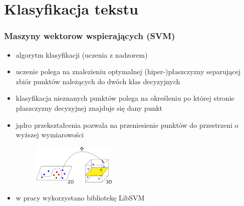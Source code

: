 \documentclass[11pt,t]{beamer}
\begin{document}
\section{Klasyfikacja tekstu}
\begin{frame}
\frametitle{Maszyny wektorow wspierających (SVM)}
\begin{itemize}
\item<1-> algorytm klasyfikacji (uczenia z nadzorem)
\item<2-> uczenie polega na znalezieniu optymalnej (hiper-)płaszczyzny separującej zbiór punktów należących do dwóch klas decyzyjnych
\item<3-> klasyfikacja nieznanych punktów polega na określeniu po której stronie płaszczyzny decyzyjnej znajduje się dany punkt
\item<4-> jądro przekształcenia pozwala na przeniesienie punktów do przestrzeni o wyższej wymiarowości

\begin{center}
\begin{figure}
\centering
\includegraphics[width=4cm]{2dto3d.png}
\end{figure}
\end{center}
\item<5-> w pracy wykorzystano bibliotekę LibSVM
\end{itemize}
\end{frame}

\end{document}
